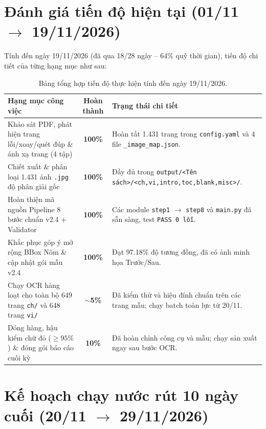 \documentclass[12pt,a4paper]{article}
\begin{document}
\section{Đánh giá tiến độ hiện tại (01/11 \texorpdfstring{$\to$}{-} 19/11/2026)}

Tính đến ngày 19/11/2026 (đã qua 18/28 ngày -- 64\% quỹ thời gian), tiến độ chi tiết của từng hạng mục như sau:

\begin{table}[H]
\centering
\begin{tabularx}{\textwidth}{>{\raggedright\arraybackslash}p{6.2cm} c >{\raggedright\arraybackslash}X}
\toprule
\textbf{Hạng mục công việc} & \textbf{Hoàn thành} & \textbf{Trạng thái chi tiết} \\
\midrule
Khảo sát PDF, phát hiện trang lỗi/xoay/quét đúp \& ánh xạ trang (4 tập) & \textbf{100\%} & Hoàn tất 1.431 trang trong \texttt{config.yaml} và 4 file \texttt{\_image\_map.json}. \\
Chiết xuất \& phân loại 1.431 ảnh \texttt{.jpg} độ phân giải gốc & \textbf{100\%} & Đầy đủ trong \texttt{output/<Tên sách>/<ch,vi,intro,toc,blank,misc>/}. \\
Hoàn thiện mã nguồn Pipeline 8 bước chuẩn v2.4 + Validator & \textbf{100\%} & Các module \texttt{step1} $\to$ \texttt{step8} và \texttt{main.py} đã sẵn sàng, test \texttt{PASS 0 lỗi}. \\
Khắc phục góp ý mở rộng BBox Nôm \& cập nhật gói mẫu v2.4 & \textbf{100\%} & Đạt 97.18\% độ tương đồng, đã có ảnh minh họa Trước/Sau. \\
Chạy OCR hàng loạt cho toàn bộ 649 trang \texttt{ch/} và 648 trang \texttt{vi/} & \textbf{$\sim$5\%} & Đã kiểm thử và hiệu đính chuẩn trên các trang mẫu; chạy batch toàn lực từ 20/11. \\
Dóng hàng, hậu kiểm chữ đỏ ($\ge 95\%$) \& đóng gói báo cáo cuối kỳ & \textbf{10\%} & Đã hoàn chỉnh công cụ và mẫu; chạy sản xuất ngay sau bước OCR. \\
\bottomrule
\end{tabularx}
\caption{Bảng tổng hợp tiến độ thực hiện tính đến ngày 19/11/2026.}
\end{table}

\section{Kế hoạch chạy nước rút 10 ngày cuối (20/11 \texorpdfstring{$\to$}{-} 29/11/2026)}
\end{document}
